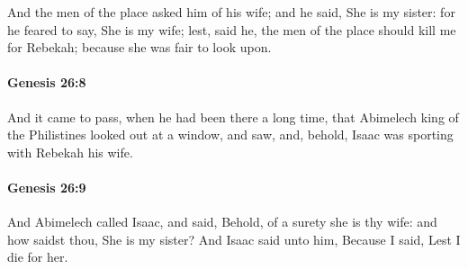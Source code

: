 			And the men of the place asked him of his wife; and he said, She is my sister: for he feared to say, She is my wife; lest, said he, the men of the place should kill me for Rebekah; because she was fair to look upon.


		\paragraph{Genesis 26:8} %
			\label{GENESIS-26-8}

			And it came to pass, when he had been there a long time, that Abimelech king of the Philistines looked out at a window, and saw, and, behold, Isaac was sporting with Rebekah his wife.


		\paragraph{Genesis 26:9} %
			\label{GENESIS-26-9}

			And Abimelech called Isaac, and said, Behold, of a surety she is thy wife: and how saidst thou, She is my sister?  And Isaac said unto him, Because I said, Lest I die for her.


